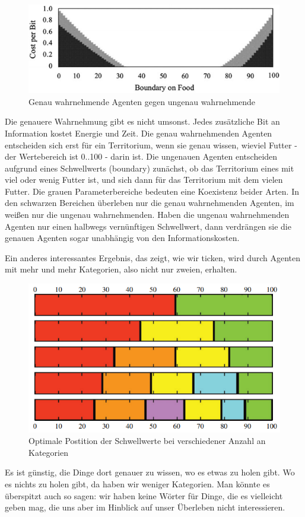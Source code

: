 \documentclass[12pt]{book}
\begin{document}
\begin{figure}[!h]\begin{center}
  \includegraphics[width=13cm]{Bilder/Single_Resource_Game.png}
  \caption{Genau wahrnehmende Agenten gegen ungenau wahrnehmende}
  \label{fig:sr_game}
\end{center}\end{figure}

Die genauere Wahrnehmung gibt es nicht umsonst. Jedes zusätzliche Bit an Information kostet Energie und Zeit. Die genau wahrnehmenden Agenten entscheiden sich erst für ein Territorium, wenn sie genau wissen, wieviel Futter - der Wertebereich ist 0..100 - darin ist. Die ungenauen Agenten entscheiden aufgrund eines Schwellwerts (boundary) zunächst, ob das Territorium eines mit viel oder wenig Futter ist, und sich dann für das Territorium mit dem vielen Futter. Die grauen Parameterbereiche bedeuten eine Koexistenz beider Arten. In den schwarzen Bereichen überleben nur die genau wahrnehmenden Agenten, im weißen nur die ungenau wahrnehmenden. Haben die ungenau wahrnehmenden Agenten nur einen halbwegs vernünftigen Schwellwert, dann verdrängen sie die genauen Agenten sogar unabhängig von den Informationskosten.

Ein anderes interessantes Ergebnis, das zeigt, wie wir ticken, wird durch Agenten mit mehr und mehr Kategorien, also nicht nur zweien, erhalten. 
\begin{figure}[!h]\begin{center}
  \includegraphics[width=13cm]{Bilder/nCat_Agenten.png}
  \caption{Optimale Postition der Schwellwerte bei verschiedener Anzahl an Kategorien}
  \label{fig:ncat_agents}
\end{center}\end{figure}
Es ist günstig, die Dinge dort genauer zu wissen, wo es etwas zu holen gibt. Wo es nichts zu holen gibt, da haben wir weniger Kategorien. Man könnte es überspitzt auch so sagen: wir haben keine Wörter für Dinge, die es vielleicht geben mag, die uns aber im Hinblick auf unser Überleben nicht interessieren.
\end{document}
